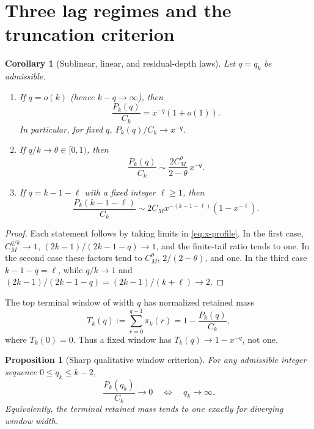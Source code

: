 \documentclass[11pt]{article}
\newtheorem{corollary}[theorem]{Corollary}
\newtheorem{proposition}[theorem]{Proposition}
\theoremstyle{remark}
\begin{document}
\section{Three lag regimes and the truncation criterion}

\begin{corollary}[Sublinear, linear, and residual-depth laws]
\label{cor:regimes}
Let $q=q_k$ be admissible.
\begin{enumerate}
\item If $q=o(k)$ (hence $k-q\to\infty$), then
\begin{equation}\label{eq:sublinear}
 \frac{P_k(q)}{C_k}=x^{-q}(1+o(1)).
\end{equation}
In particular, for fixed $q$, $P_k(q)/C_k\to x^{-q}$.
\item If $q/k\to\theta\in[0,1)$, then
\begin{equation}\label{eq:linear}
 \frac{P_k(q)}{C_k}
 \sim \frac{2C_M^\theta}{2-\theta}\,x^{-q}.
\end{equation}
\item If $q=k-1-\ell$ with a fixed integer $\ell\ge1$, then
\begin{equation}\label{eq:residual}
 \frac{P_k(k-1-\ell)}{C_k}
 \sim 2C_Mx^{-(k-1-\ell)}(1-x^{-\ell}).
\end{equation}
\end{enumerate}
\end{corollary}

\begin{proof}
Each statement follows by taking limits in \eqref{eq:x-profile}.  In the
first case, $C_M^{q/k}\to1$, $(2k-1)/(2k-1-q)\to1$, and the finite-tail
ratio tends to one.  In the second case these factors tend to
$C_M^\theta$, $2/(2-\theta)$, and one.  In the third case
$k-1-q=\ell$, while $q/k\to1$ and
$(2k-1)/(2k-1-q)=(2k-1)/(k+\ell)\to2$.
\end{proof}

The top terminal window of width $q$ has normalized retained mass
\begin{equation}\label{eq:retained}
 T_k(q):=\sum_{r=0}^{q-1}\pi_k(r)
 =1-\frac{P_k(q)}{C_k},
\end{equation}
where $T_k(0)=0$.  Thus a fixed window has
$T_k(q)\to1-x^{-q}$, not one.

\begin{proposition}[Sharp qualitative window criterion]\label{prop:criterion}
For any admissible integer sequence $0\le q_k\le k-2$,
\begin{equation}\label{eq:iff}
 \frac{P_k(q_k)}{C_k}\longrightarrow0
 \quad\Longleftrightarrow\quad q_k\longrightarrow\infty.
\end{equation}
Equivalently, the terminal retained mass tends to one exactly for diverging
window width.
\end{proposition}
\end{document}
